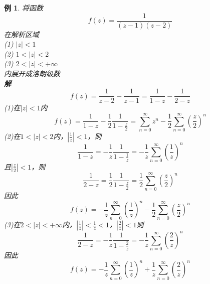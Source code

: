 \documentclass[12pt, a4paper, twoside]{ctexbook}
\newtheorem{example}[theorem]{例}
\begin{document}
\begin{example}
	将函数
	$$
	f\left(z\right)=\frac{1}{\left(z-1\right)\left(z-2\right)}
	$$
	\hspace*{2em}在解析区域\\
	\hspace*{2em}(1) $\left|z\right|<1$\\
	\hspace*{2em}(2) $1<\left|z\right|<2$\\
	\hspace*{2em}(3) $2<\left|z\right|<+\infty$\\
	\hspace*{2em}内展开成洛朗级数\\
	\hspace*{1em}\textbf{解}
	$$
	f\left(z\right)=\frac{1}{z-2}-\frac{1}{z-1}=\frac{1}{1-z}-\frac{1}{2-z}
	$$
	\hspace*{2em}(1)在$\left|z\right|<1$内
	$$
	f\left(z\right)=\frac{1}{1-z}-\frac{1}{2}\frac{1}{1-\frac{z}{2}}=\sum_{n=0}^{\infty}z^n-\frac{1}{2}\sum_{n=0}^{\infty}\left(\frac{z}{2}\right)^n
	$$
	\newpage
	(2)在$1<\left|z\right|<2$内，$\left|\frac{1}{z}\right|<1$，则
	$$
	\frac{1}{1-z}=-\frac{1}{z}\frac{1}{1-\frac{1}{z}}=-\frac{1}{z}\sum_{n=0}^{\infty}\left(\frac{1}{z}\right)^n
	$$
	\hspace*{2em}且$\left|\frac{z}{2}\right|<1$，则
	$$
	\frac{1}{2-z}=\frac{1}{2}\frac{1}{1-\frac{z}{2}}=\frac{1}{2}\sum_{n=0}^{\infty}\left(\frac{z}{2}\right)^n
	$$
	\hspace*{2em}因此
	$$
	f\left(z\right)=-\frac{1}{z}\sum_{n=0}^{\infty}\left(\frac{1}{z}\right)^n-\frac{1}{2}\sum_{n=0}^{\infty}\left(\frac{z}{2}\right)^n
	$$
	\hspace*{2em}(3)在$2<\left|z\right|<+\infty$内，$\left|\frac{1}{z}\right|<\frac{1}{z}<1$，$\left|\frac{2}{z}\right|<1$则
	$$
	\frac{1}{2-z}=-\frac{1}{z}\frac{1}{1-\frac{2}{z}}=-\frac{1}{z}\sum_{n=0}^{\infty}\left(\frac{2}{z}\right)^n
	$$
	\hspace*{2em}因此
	$$
	f\left(z\right)=-\frac{1}{z}\sum_{n=0}^{\infty}\left(\frac{1}{z}\right)^n+\frac{1}{z}\sum_{n=0}^{\infty}\left(\frac{2}{z}\right)^n
	$$
\end{example}
\end{document}
